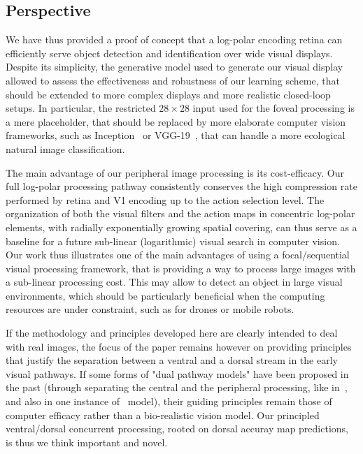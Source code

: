 \subsection{Perspective}

We have thus provided a proof of concept that a log-polar encoding retina can efficiently serve object detection and identification over wide visual displays. Despite its simplicity, the generative model used to generate our visual display allowed to assess the effectiveness and robustness of our learning scheme, that should be extended to more complex displays and more realistic closed-loop setups.
In particular, the restricted $28\times28$ input used for the foveal processing is a mere placeholder, that should be replaced by more elaborate computer vision frameworks, such as Inception~\cite{szegedy2015going} or VGG-19~\cite{simonyan2014very}, that can handle a more ecological natural image classification.

The main advantage of our peripheral image processing is its cost-efficacy. Our full log-polar processing pathway consistently conserves the high compression rate performed by retina and V1 encoding up to the action selection level. The organization of both the visual filters and the action maps in concentric log-polar elements, with radially exponentially growing spatial covering, can thus serve as a baseline for a future sub-linear (logarithmic) visual search in computer vision. Our work thus illustrates one of the main advantages of using a focal/sequential visual processing framework, that is providing a way to process large images with a sub-linear processing cost.
This may allow to detect an object in large visual environments, which should be particularly beneficial when the computing resources are under constraint, such as for drones or mobile robots.


If the methodology and principles developed here are clearly intended to deal with real images, the focus of the paper remains however on providing principles that  justify the separation between a ventral and a dorsal stream in the early visual pathways. If some forms of "dual pathway models" have been proposed in the past (through separating the central and the peripheral processing, like in~\cite{denil2012learning}, and also in one instance of~\cite{akbas2017object} model), their guiding principles remain those of computer efficacy rather than a bio-realistic vision model. Our principled ventral/dorsal concurrent processing, rooted on dorsal accuray map predictions, is thus we think important and novel.

